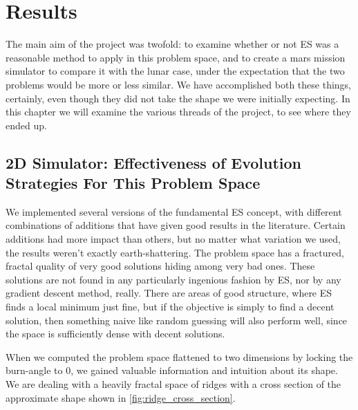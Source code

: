 
\chapter{Results}
The main aim of the project was twofold: to examine whether or not ES was a reasonable method to apply in this problem space, and to create a mars mission simulator to compare it with the lunar case, under the expectation that the two problems would be more or less similar. We have accomplished both these things, certainly, even though they did not take the shape we were initially expecting. In this chapter we will examine the various threads of the project, to see where they ended up.

\section{2D Simulator: Effectiveness of Evolution Strategies For This Problem Space}
We implemented several versions of the fundamental ES concept, with different combinations of additions that have given good results in the literature. Certain additions had more impact than others, but no matter what variation we used, the results weren't exactly earth-shattering. The problem space has a fractured, fractal quality of very good solutions hiding among very bad ones. These solutions are not found in any particularly ingenious fashion by ES, nor by any gradient descent method, really. There are areas of good structure, where ES finds a local minimum just fine, but if the objective is simply to find a decent solution, then something naive like random guessing will also perform well, since the space is sufficiently dense with decent solutions. 

When we computed the problem space flattened to two dimensions by locking the burn-angle to 0, we gained valuable information and intuition about its shape. We are dealing with a heavily fractal space of ridges with a cross section of the approximate shape shown in \cref{fig:ridge_cross_section}.

